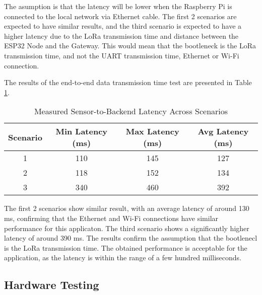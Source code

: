 The asumption is that the latency will be lower when the Raspberry Pi is connected to the local network via Ethernet cable.
The first 2 scenarios are expected to have similar results, and the third scenario is expected to have a higher latency due to the LoRa transmission
time and distance between the ESP32 Node and the Gateway. This would mean that the bootleneck is the LoRa transmission time, and not the UART transmission time,
Ethernet or Wi-Fi connection.

The results of the end-to-end data transmission time test are presented in Table \ref{tab:latency_results}.
\begin{table}[H]
\centering
\begin{tabular}{|c|c|c|c|}
\hline
\textbf{Scenario} & \textbf{Min Latency (ms)} & \textbf{Max Latency (ms)} & \textbf{Avg Latency (ms)} \\
\hline
1 & 110 & 145 & 127 \\
\hline
2 & 118 & 152 & 134 \\
\hline
3 & 340 & 460 & 392 \\
\hline
\end{tabular}
\caption{Measured Sensor-to-Backend Latency Across Scenarios}
\label{tab:latency_results}
\end{table}

The first 2 scenarios show similar result, with an average latency of around 130 ms, confirming that the Ethernet and Wi-Fi connections have similar
performance for this applicaton. The third scenario shows a significantly higher latency of around 390 ms. The results confirm the assumption
that the bootlenecl is the LoRa transmission time. The obtained performance is acceptable for the application, as the latency is within the range of 
a few hundred milliseconds. 

\subsection{Hardware Testing}
